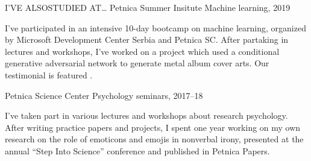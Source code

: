 \begin{minipage}[t]{\linewidth}\vspace{\sectionTopmargin}
{\alignRight\titleFont\light I'VE ALSO\linebreak\alignRight STUDIED AT\ldots\vspace{2mm}}\newline
{\alignRight\rSubtitleFont\bold Petnica Summer Insitute}\newline
{\alignRight\rSubSubtitleFont\light Machine learning, 2019}\linebreak\newline

\vspace{\rContentTopMargin}
{\contentFont I've participated in an intensive 10-day bootcamp on machine learning, organized by Microsoft Development Center Serbia and Petnica SC. After partaking in lectures and workshops, I've worked on a project which used a conditional generative adversarial network to generate metal album cover arts. Our testimonial is featured .}

\end{minipage}\newline%
%
\begin{minipage}[t]{\linewidth}\vspace{\subsectionSpace}
{\alignRight\rSubtitleFont\bold Petnica Science Center}\newline
{\alignRight\rSubSubtitleFont\light Psychology seminars, 2017–18}\linebreak\newline

\vspace{\rContentTopMargin}
{\contentFont I've taken part in various lectures and workshops about research psychology. After writing practice papers and projects, I spent one year working on my own research on the role of emoticons and emojis in nonverbal irony, presented at the annual “Step Into Science” conference and published in Petnica Papers.}
\end{minipage}\newline%
%
%
